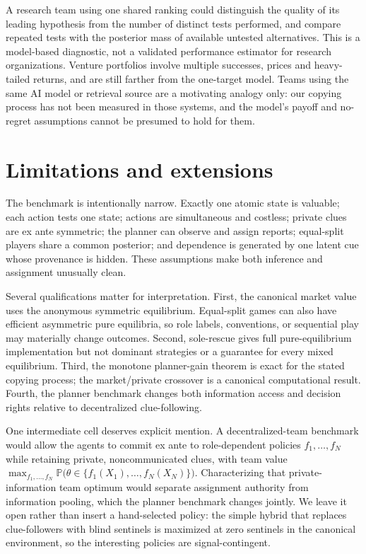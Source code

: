 \documentclass[11pt]{article}
\theoremstyle{definition}
\theoremstyle{remark}
\newcommand{\Prob}{\mathbb{P}}
\newcommand{\1}{\mathbf{1}}
\begin{document}
A research team using one shared ranking could distinguish the quality of its leading hypothesis from the number of distinct tests performed, and compare repeated tests with the posterior mass of available untested alternatives. This is a model-based diagnostic, not a validated performance estimator for research organizations. Venture portfolios involve multiple successes, prices and heavy-tailed returns, and are still farther from the one-target model. Teams using the same AI model or retrieval source are a motivating analogy only: our copying process has not been measured in those systems, and the model's payoff and no-regret assumptions cannot be presumed to hold for them.

\section{Limitations and extensions}
\label{sec:limitations}

The benchmark is intentionally narrow. Exactly one atomic state is valuable; each action tests one state; actions are simultaneous and costless; private clues are ex ante symmetric; the planner can observe and assign reports; equal-split players share a common posterior; and dependence is generated by one latent cue whose provenance is hidden. These assumptions make both inference and assignment unusually clean.

Several qualifications matter for interpretation. First, the canonical market value uses the anonymous symmetric equilibrium. Equal-split games can also have efficient asymmetric pure equilibria, so role labels, conventions, or sequential play may materially change outcomes. Second, sole-rescue gives full pure-equilibrium implementation but not dominant strategies or a guarantee for every mixed equilibrium. Third, the monotone planner-gain theorem is exact for the stated copying process; the market/private crossover is a canonical computational result. Fourth, the planner benchmark changes both information access and decision rights relative to decentralized clue-following.

One intermediate cell deserves explicit mention. A decentralized-team benchmark would allow the agents to commit ex ante to role-dependent policies $f_1,\ldots,f_N$ while retaining private, noncommunicated clues, with team value $\max_{f_1,\ldots,f_N}\Prob\bigl(\theta\in\{f_1(X_1),\ldots,f_N(X_N)\}\bigr)$. Characterizing that private-information team optimum would separate assignment authority from information pooling, which the planner benchmark changes jointly. We leave it open rather than insert a hand-selected policy: the simple hybrid that replaces clue-followers with blind sentinels is maximized at zero sentinels in the canonical environment, so the interesting policies are signal-contingent.
\end{document}
